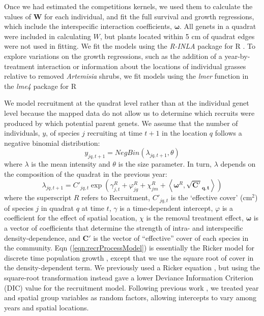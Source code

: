 \documentclass[11pt]{article}
\begin{document}
\begin{doublespacing}
Once we had estimated the competitions kernels, we used them to calculate the values of $\boldsymbol{W}$ for each individual, 
and fit the full survival and growth regressions, which include the interspecific interaction coefficients, $\boldsymbol{\omega}$. 
All genets in a quadrat were included in calculating $W$, but plants located within 5 cm of quadrat edges were not used in fitting. 
We fit the models using the \textit{R-INLA} package for R \citep{rue_approximate_2009}. To explore variations on the growth regressions, such as the addition of a year-by-treatment interaction or information about the locations of individual grasses relative to removed \textit{Artemisia} shrubs, we fit models using the \textit{lmer} function in the \textit{lme4} package for R

We model recruitment at the quadrat level rather than at the individual genet level because the mapped data do not allow us to determine which recruits were produced by which potential parent genets. We assume that the number of individuals, $y$, of species $j$ recruiting at time $t+1$ in the location $q$ follows a negative binomial distribution:
\begin{equation}
y_{jq,t+1}= NegBin(\lambda_{jq,t+1},\theta) 	   
\label{eqn:recrDataModel}
\end{equation}
where $\lambda$ is the mean intensity and $\theta$ is the size parameter. In turn, $\lambda$ depends on the composition of the quadrat in the previous year:
\begin{equation}
\lambda_{jq,t+1} = C'_{jq,t} \exp{\left(\gamma_{j,t}^R +  \varphi_{jg}^R + \chi_{jm}^R + 
\left \langle \boldsymbol{\omega}^R , \boldsymbol{\sqrt{C'}_{q,t}} \right \rangle \right) }
\label{eqn:recrProcessModel}
\end{equation}
where the superscript $R$ refers to Recruitment, $C'_{jq,t}$ is the `effective cover' (cm$^2$) of species $j$ in quadrat $q$ at time $t$, $\gamma$ is a time-dependent intercept, $\varphi$ is a coefficient for the effect of spatial location,
$\chi$ is the removal treatment effect, $\boldsymbol{\omega}$ is a vector of coefficients that determine the strength of intra- and interspecific density-dependence, and $\boldsymbol{C'}$ is the vector of ``effective'' cover of each species in the community. Eqn (\ref{eqn:recrProcessModel}) is essentially the Ricker model for discrete time population growth \citep{ricker_stock_1954}, except that we use the square root of cover in the density-dependent term. We previously used a Ricker equation \citep{adler_coexistence_2010}, but using the square-root transformation instead gave a lower Deviance Information Criterion (DIC) value \citep{spiegelhalter_bayesian_2002} for the recruitment model. Following previous work \citep{adler_coexistence_2010}, we treated year and spatial group variables as random factors, allowing intercepts to vary among years and spatial locations. 


\end{doublespacing}
\end{document}
